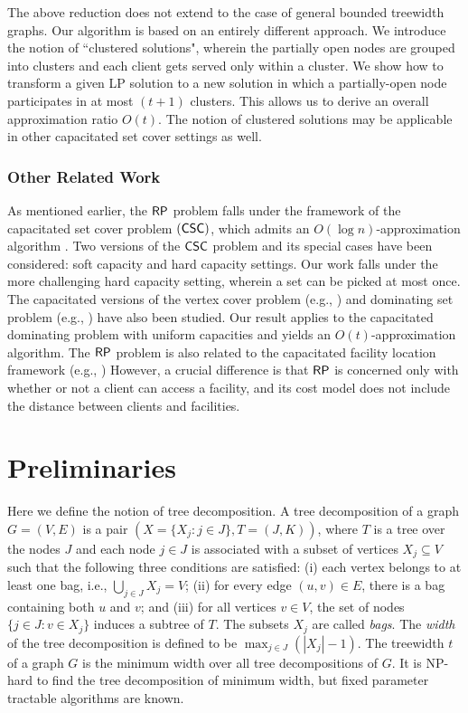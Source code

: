 \documentclass[11pt]{article}
\newcommand{\mypara}[1] {\subsubsection*{#1}}
\newcommand{\RP} {{\sf RP}}
\newcommand{\CSC} {{\sf CSC}}
\begin{document}
The above reduction does not extend to the case of general bounded treewidth graphs.
Our algorithm is based on an entirely different approach.
We introduce the notion of ``clustered solutions",
wherein the partially open nodes are grouped into clusters
and each client gets served only within a cluster.
We show how to transform a given LP solution
to a new solution in which a partially-open node participates in at most $(t+1)$ clusters.
This allows us to derive an overall approximation ratio $O(t)$.
The notion of clustered solutions may be applicable in other capacitated set cover settings as well.

\mypara{Other Related Work}
As mentioned earlier, the $\RP$ problem falls under the framework of the capacitated set cover problem $(\CSC)$,
which admits an $O(\log n)$-approximation algorithm \cite{Chuzhoy}.
Two versions of the $\CSC$ problem and its special cases have been considered:
soft capacity and hard capacity settings.
Our work falls under the more challenging hard capacity setting, wherein a set can be picked at most once.
The capacitated versions of the vertex cover problem (e.g., \cite{Khuller-Saha}) and dominating set problem (e.g., \cite{kao-hc})
have also been studied.  Our result applies to the capacitated dominating problem with uniform capacities 
and yields an $O(t)$-approximation algorithm.
The $\RP$ problem is also related to the capacitated facility location framework (e.g., \cite{facility-location})
However, a crucial difference is that $\RP$ is concerned only with whether or not a client can access a
facility, and its cost model does not include the distance between clients and facilities.


\section{Preliminaries}
\label{sec:prelims}
Here we define the notion of tree decomposition.
A tree decomposition of a graph $G = (V,E)$ is a pair $(X = \{ X_j : j \in J \}, T = (J,K))$,
where $T$ is a tree over the nodes $J$ and each node $j \in J$ is associated with 
a subset of vertices $X_j \subseteq V$ such that the following three conditions are satisfied: 
(i) each vertex belongs to at least one bag, i.e., $\bigcup_{j \in J} X_j = V$;
(ii) for every edge $(u,v) \in E$, there is a bag containing both $u$ and $v$; and
(iii) for all vertices $v \in V$, the set of nodes $\{j \in J : v \in X_j \}$
induces a subtree of $T$. The subsets $X_j$ are called {\em bags}.
%
The {\em width} of the tree decomposition is defined to be 
$\max_{j \in J} \left( |X_j|-1 \right)$.
The treewidth $t$ of a graph $G$ is the minimum width over all tree decompositions of $G$.
It is NP-hard to find the tree decomposition of minimum width, 
but fixed parameter tractable algorithms are known.
\end{document}
